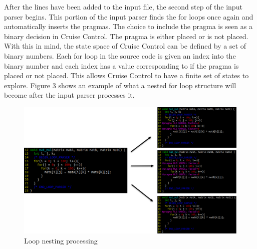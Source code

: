 \documentclass[letterpaper, 10 pt, conference]{IEEEconf}  %
\begin{document}
After the lines have been added to the input file, the second step of the input parser begins. This portion of the input parser finds the for loops once again and automatically inserts the pragmas. The choice to include the pragma is seen as a binary decision in Cruise Control. The pragma is either placed or is not placed. With this in mind, the state space of Cruise Control can be defined by a set of binary numbers. Each for loop in the source code is given an index into the binary number and each index has a value corresponding to if the pragma is placed or not placed. This allows Cruise Control to have a finite set of states to explore. Figure 3 shows an example of what a nested for loop structure will become after the input parser processes it. \newline

\begin{figure}[H]
\centering
\includegraphics[scale=.35]{for_loops.png} 
\caption{Loop nesting processing}
\end{figure}
\end{document}
